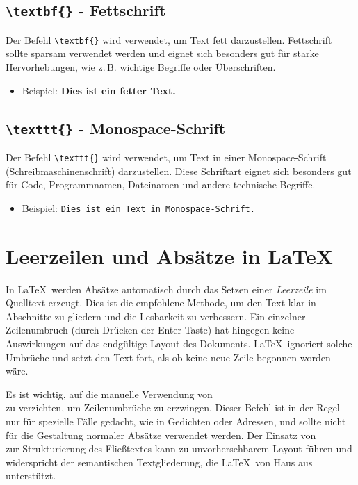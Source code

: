 \subsection{\texttt{\textbackslash textbf\{\}} - Fettschrift}

Der Befehl \texttt{\textbackslash textbf\{\}} wird verwendet, um Text fett
darzustellen. Fettschrift sollte sparsam verwendet werden und eignet sich
besonders gut für starke Hervorhebungen, wie z.\,B. wichtige Begriffe oder
Überschriften.

\begin{itemize}
    \item Beispiel: \textbf{Dies ist ein fetter Text.}
\end{itemize}

\subsection{\texttt{\textbackslash texttt\{\}} - Monospace-Schrift}

Der Befehl \texttt{\textbackslash texttt\{\}} wird verwendet, um Text in einer
Monospace-Schrift (Schreibmaschinenschrift) darzustellen. Diese Schriftart
eignet sich besonders gut für Code, Programmnamen, Dateinamen und andere
technische Begriffe.

\begin{itemize}
    \item Beispiel: \texttt{Dies ist ein Text in Monospace-Schrift.}
\end{itemize}



\section{Leerzeilen und Absätze in LaTeX}

In \LaTeX\ werden Absätze automatisch durch das Setzen einer \textit{Leerzeile}
im Quelltext erzeugt. Dies ist die empfohlene Methode, um den Text klar in
Abschnitte zu gliedern und die Lesbarkeit zu verbessern. Ein einzelner
Zeilenumbruch (durch Drücken der Enter-Taste) hat hingegen keine Auswirkungen
auf das endgültige Layout des Dokuments. \LaTeX\ ignoriert solche Umbrüche und
setzt den Text fort, als ob keine neue Zeile begonnen worden wäre.

Es ist wichtig, auf die manuelle Verwendung von \texttt{\\} zu
verzichten, um Zeilenumbrüche zu erzwingen. Dieser Befehl ist in der Regel nur
für spezielle Fälle gedacht, wie in Gedichten oder Adressen, und sollte nicht
für die Gestaltung normaler Absätze verwendet werden. Der Einsatz von
\texttt{\\} zur Strukturierung des Fließtextes kann zu
unvorhersehbarem Layout führen und widerspricht der semantischen Textgliederung,
die \LaTeX\ von Haus aus unterstützt.

